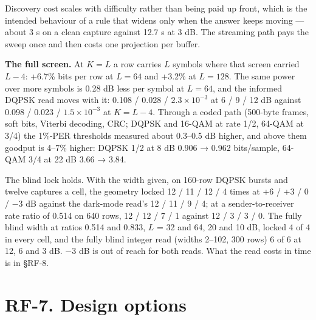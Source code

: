 \documentclass[10pt,letterpaper,twocolumn]{article}
\begin{document}
Discovery cost scales with difficulty rather than being paid up front, which is the intended behaviour of a rule that widens only when the answer keeps moving --- about 3 s on a clean capture against 12.7 s at 3 dB. The streaming path pays the sweep once and then costs one projection per buffer.

\textbf{The full screen.} At \(K = L\) a row carries \(L\) symbols where that screen carried \(L - 4\): +6.7\% bits per row at \(L = 64\) and +3.2\% at \(L = 128\). The same power over more symbols is 0.28 dB less per symbol at \(L = 64\), and the informed DQPSK read moves with it: 0.108 / 0.028 / \(2.3\times10^{-3}\) at 6 / 9 / 12 dB against 0.098 / 0.023 / \(1.5\times10^{-3}\) at \(K = L - 4\). Through a coded path (500-byte frames, soft bits, Viterbi decoding, CRC; DQPSK and 16-QAM at rate 1/2, 64-QAM at 3/4) the 1\%-PER thresholds measured about 0.3--0.5 dB higher, and above them goodput is 4--7\% higher: DQPSK 1/2 at 8 dB 0.906 → 0.962 bits/sample, 64-QAM 3/4 at 22 dB 3.66 → 3.84.

The blind lock holds. With the width given, on 160-row DQPSK bursts and twelve captures a cell, the geometry locked 12 / 11 / 12 / 4 times at +6 / +3 / 0 / −3 dB against the dark-mode read's 12 / 11 / 9 / 4; at a sender-to-receiver rate ratio of 0.514 on 640 rows, 12 / 12 / 7 / 1 against 12 / 3 / 3 / 0. The fully blind width at ratios 0.514 and 0.833, \(L\) = 32 and 64, 20 and 10 dB, locked 4 of 4 in every cell, and the fully blind integer read (widths 2--102, 300 rows) 6 of 6 at 12, 6 and 3 dB. −3 dB is out of reach for both reads. What the read costs in time is in §RF-8.

\section{RF-7. Design options}\label{rf-7-design-options}
\end{document}
